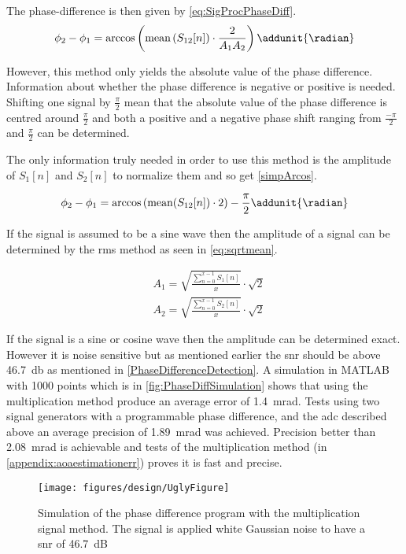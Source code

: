 The phase-difference is then given by \autoref{eq:SigProcPhaseDiff}.
\begin{equation}\label{eq:SigProcPhaseDiff}
\phi_2-\phi_1=  \arccos \left( \text{mean} \left( S_{12}[n]\right) \cdot \frac{2}{A_1 A_2}\right) \addunit{\radian}	
\end{equation}

However, this method only yields the absolute value of the phase difference. Information about whether the phase difference is negative or positive is needed. Shifting one signal by $\frac{\pi}{2}$ mean that the absolute value of the phase difference is centred around $\frac{\pi}{2}$ and both a positive and a negative phase shift ranging from $\frac{-\pi}{2}$ and $\frac{\pi}{2}$ can be determined.

The only information truly needed in order to use this method is the amplitude of $S_{1}[n]$ and $S_{2}[n]$ to normalize them and so get \autoref{simpArcos}.

\begin{equation}\label{simpArcos}
\phi_2-\phi_1=  \arccos \left( \text{mean} (S_{12}[n]) \cdot2\right) -\frac{\pi}{2} \addunit{\radian}	
\end{equation}

If the signal is assumed to be a sine wave then the amplitude of a signal can be determined by the \gls{rms} method as seen in \autoref{eq:sqrtmean}.

\begin{subequations} \label{eq:sqrtmean}
	\begin{align}
	&A_1 = \sqrt{\frac{\sum\limits_{n=0}^{x-1}{S_{1}[n]}}{x}}\cdot\sqrt{2} \\
	&A_2 = \sqrt{\frac{\sum\limits_{n=0}^{x-1}{S_{2}[n]}}{x}}\cdot\sqrt{2}
	\end{align}
\end{subequations}
\startexplain
{}
\stopexplain

If the signal is a sine or cosine wave then the amplitude can be determined exact. However it is noise sensitive but as mentioned earlier the \gls{snr} should be above \SI{46.7}{\decibel} as mentioned in \autoref{PhaseDifferenceDetection}. A simulation in MATLAB with 1000 points which is in \autoref{fig:PhaseDiffSimulation} shows that using the multiplication method produce an average error of \SI{1.4}{\milli\radian}. Tests using two signal generators with a programmable phase difference, and the \gls{adc} described above an average precision of \SI{1.89}{\milli\radian} was achieved. Precision better than \SI{2.08}{\milli\radian} is achievable and tests of the multiplication method (in \autoref{appendix:aoaestimationerr}) proves it is fast and precise.

\begin{figure}[h!]
	\centering
	\texttt{[image: figures/design/UglyFigure]}
	\caption{Simulation of the phase difference program with the multiplication signal method. The signal is applied white Gaussian noise to have a \gls{snr} of \SI{46.7}{\deci\bel}}
	\label{fig:PhaseDiffSimulation}
\end{figure}


